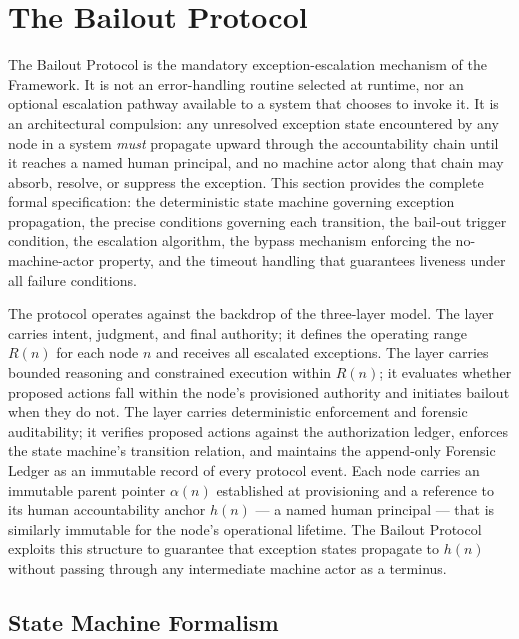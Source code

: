 \section{The Bailout Protocol}\label{sec:bailout}

The Bailout Protocol is the mandatory exception-escalation mechanism of the \bxthree{} Framework. It is not an error-handling routine selected at runtime, nor an optional escalation pathway available to a system that chooses to invoke it. It is an architectural compulsion: any unresolved exception state encountered by any node in a \bxthree{} system \emph{must} propagate upward through the accountability chain until it reaches a named human principal, and no machine actor along that chain may absorb, resolve, or suppress the exception. This section provides the complete formal specification: the deterministic state machine governing exception propagation, the precise conditions governing each transition, the bail-out trigger condition, the escalation algorithm, the bypass mechanism enforcing the no-machine-actor property, and the timeout handling that guarantees liveness under all failure conditions.

The protocol operates against the backdrop of the \bxthree{} three-layer model. The \purpose{} layer carries intent, judgment, and final authority; it defines the operating range $R(n)$ for each node $n$ and receives all escalated exceptions. The \bounds{} layer carries bounded reasoning and constrained execution within $R(n)$; it evaluates whether proposed actions fall within the node's provisioned authority and initiates bailout when they do not. The \fact{} layer carries deterministic enforcement and forensic auditability; it verifies proposed actions against the authorization ledger, enforces the state machine's transition relation, and maintains the append-only Forensic Ledger as an immutable record of every protocol event. Each node carries an immutable parent pointer $\alpha(n)$ established at provisioning and a reference to its human accountability anchor $h(n)$ — a named human principal — that is similarly immutable for the node's operational lifetime. The Bailout Protocol exploits this structure to guarantee that exception states propagate to $h(n)$ without passing through any intermediate machine actor as a terminus.

\subsection{State Machine Formalism}\label{sec:state-machine}

